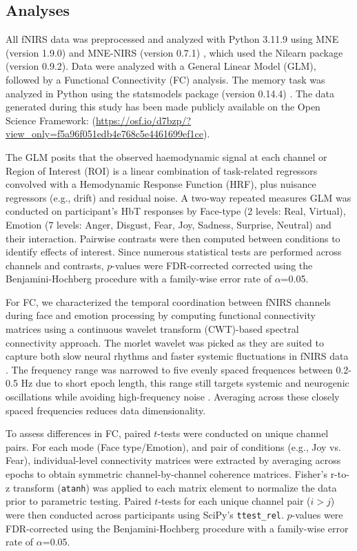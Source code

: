 \subsection*{Analyses}
All fNIRS data was preprocessed and analyzed with Python 3.11.9 using MNE (version 1.9.0) \citep{gramfort_meg_2013} and MNE-NIRS (version 0.7.1) \citep{luke_analysis_2021}, which used the Nilearn package (version 0.9.2). 
Data were analyzed with a General Linear Model (GLM), followed by a Functional Connectivity (FC) analysis.
The memory task was analyzed in Python using the statsmodels package (version 0.14.4) \citep{seabold2010statsmodels}. 
The data generated during this study has been made publicly available on the Open Science Framework: (\href{https://osf.io/d7bzp/?view_only=f5a96f051edb4e768c5e4461699ef1ce}{https://osf.io/d7bzp/?view\_only=f5a96f051edb4e768c5e4461699ef1ce}). 

The GLM posits that the observed haemodynamic signal at each channel or Region of Interest (ROI) is a linear combination of task-related regressors convolved with a Hemodynamic Response Function (HRF), plus nuisance regressors (e.g., drift) and residual noise.
A two-way repeated measures GLM was conducted on participant's HbT responses by Face-type (2 levels: Real, Virtual), Emotion (7 levels: Anger, Disgust, Fear, Joy, Sadness, Surprise, Neutral) and their interaction.
Pairwise contrasts were then computed between conditions to identify effects of interest.
Since numerous statistical tests are performed across channels and contrasts, $p$-values were FDR-corrected corrected using the Benjamini-Hochberg procedure \citep{singh_exploring_2006} with a family-wise error rate of $\alpha$=0.05.

For FC, we characterized the temporal coordination between fNIRS channels during face and emotion processing by computing functional connectivity matrices using a continuous wavelet transform (CWT)-based spectral connectivity approach.
The morlet wavelet was picked as they are suited to capture both slow neural rhythms and faster systemic fluctuations in fNIRS data \citep{reddy_evaluation_2021}. 
The frequency range was narrowed to five evenly spaced frequences between 0.2-0.5 Hz due to short epoch length, this range still targets systemic and neurogenic oscillations while avoiding high-frequency noise \citep{xu_functional_2017}.
Averaging across these closely spaced frequencies reduces data dimensionality. 

To assess differences in FC, paired $t$-tests were conducted on unique channel pairs. 
For each mode (Face type/Emotion), and pair of conditions (e.g., Joy vs. Fear), individual-level connectivity matrices were extracted by averaging across epochs to obtain symmetric channel-by-channel coherence matrices. 
Fisher's r-to-z transform (\texttt{atanh}) was applied to each matrix element to normalize the data prior to parametric testing. 
Paired $t$-tests for each unique channel pair ($i > j$) were then conducted across participants using SciPy's \texttt{ttest\_rel}.
$p$-values were FDR-corrected using the Benjamini-Hochberg procedure \citep{singh_exploring_2006} with a family-wise error rate of $\alpha$=0.05.